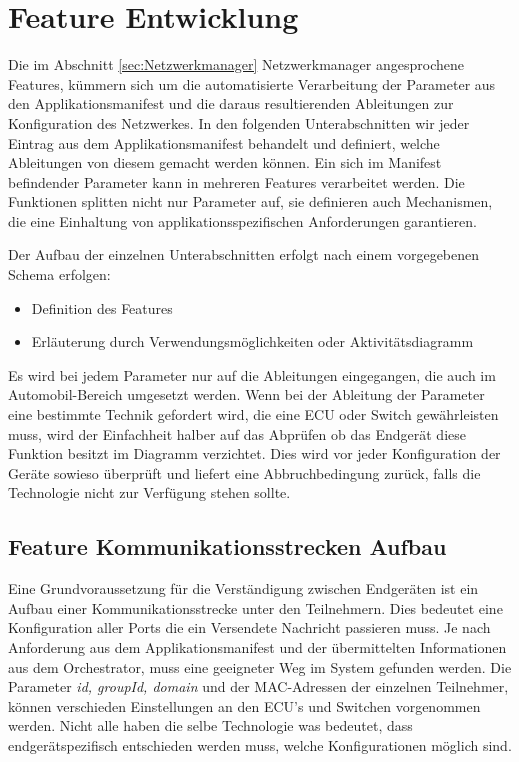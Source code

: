 \section{Feature Entwicklung}\label{sec:FeatureDef}
Die im Abschnitt \ref{sec:Netzwerkmanager} Netzwerkmanager angesprochene Features, kümmern sich um die automatisierte Verarbeitung der Parameter aus den Applikationsmanifest und die daraus resultierenden Ableitungen zur Konfiguration des Netzwerkes. In den folgenden Unterabschnitten wir jeder Eintrag aus dem Applikationsmanifest behandelt und definiert, welche Ableitungen von diesem gemacht werden können. Ein sich im Manifest befindender Parameter kann in mehreren Features verarbeitet werden. 
Die Funktionen splitten nicht nur Parameter auf, sie definieren auch Mechanismen, die eine Einhaltung von applikationsspezifischen Anforderungen garantieren. 

Der Aufbau der einzelnen Unterabschnitten erfolgt nach einem vorgegebenen Schema erfolgen:
\begin{itemize}
	\item Definition des Features
	\item Erläuterung durch Verwendungsmöglichkeiten oder Aktivitätsdiagramm 
\end{itemize}
Es wird bei jedem Parameter nur auf die Ableitungen eingegangen, die auch im Automobil-Bereich umgesetzt werden. Wenn bei der Ableitung der Parameter eine bestimmte Technik gefordert wird, die eine \ac{ECU} oder Switch gewährleisten muss, wird der Einfachheit halber auf das Abprüfen ob das Endgerät diese Funktion besitzt im Diagramm verzichtet. Dies wird vor jeder Konfiguration der Geräte sowieso überprüft und liefert eine Abbruchbedingung zurück, falls die Technologie nicht zur Verfügung stehen sollte.

\subsection{Feature Kommunikationsstrecken Aufbau}
Eine Grundvoraussetzung für die Verständigung zwischen Endgeräten ist ein Aufbau einer Kommunikationsstrecke unter den Teilnehmern. Dies bedeutet eine Konfiguration aller Ports die ein Versendete Nachricht passieren muss. Je nach Anforderung aus dem Applikationsmanifest und der übermittelten Informationen aus dem Orchestrator, muss eine geeigneter Weg im System gefunden werden. Die Parameter \emph{id, groupId, domain} und der \acs{MAC}-Adressen der einzelnen Teilnehmer, können verschieden Einstellungen an den \ac{ECU}'s und Switchen vorgenommen werden. Nicht alle haben die selbe Technologie was bedeutet, dass endgerätspezifisch entschieden werden muss, welche Konfigurationen möglich sind. 

